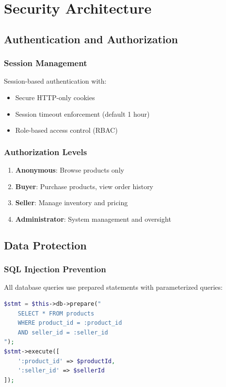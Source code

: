 \documentclass[12pt,a4paper,oneside]{report}
\begin{document}
\chapter{Security Architecture}

\section{Authentication and Authorization}

\subsection{Session Management}

Session-based authentication with:
\begin{itemize}
    \item Secure HTTP-only cookies
    \item Session timeout enforcement (default 1 hour)
    \item Role-based access control (RBAC)
\end{itemize}

\subsection{Authorization Levels}

\begin{enumerate}
    \item \textbf{Anonymous}: Browse products only
    \item \textbf{Buyer}: Purchase products, view order history
    \item \textbf{Seller}: Manage inventory and pricing
    \item \textbf{Administrator}: System management and oversight
\end{enumerate}

\section{Data Protection}

\subsection{SQL Injection Prevention}

All database queries use prepared statements with parameterized queries:

\begin{lstlisting}[language=PHP, caption=Parameterized Query Example]
$stmt = $this->db->prepare("
    SELECT * FROM products 
    WHERE product_id = :product_id 
    AND seller_id = :seller_id
");
$stmt->execute([
    ':product_id' => $productId,
    ':seller_id' => $sellerId
]);
\end{lstlisting}
\end{document}
